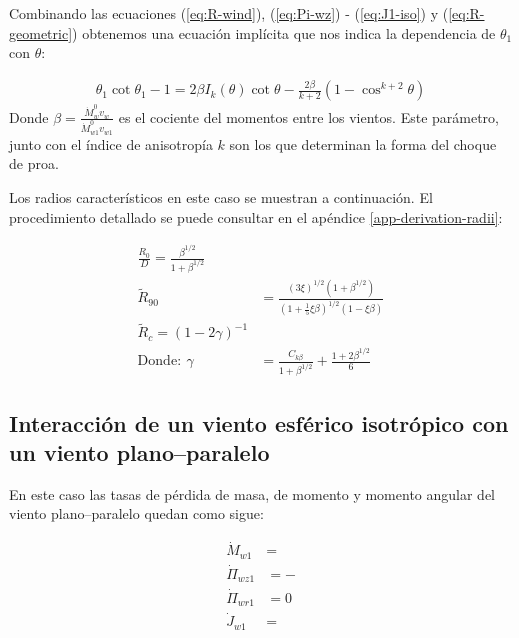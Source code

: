 Combinando las ecuaciones (\ref{eq:R-wind}), (\ref{eq:Pi-wz}) - (\ref{eq:J1-iso}) y (\ref{eq:R-geometric}) obtenemos una ecuación
implícita que nos indica la dependencia de $\theta_1$ con $\theta$:

\begin{align}
  \theta_1\cot\theta_1 -1 = 2\beta I_k(\theta)\cot\theta - \frac{2\beta}{k+2}\left(1 - \cos^{k+2}\theta\right) \label{eq:th1-th} 
\end{align}
Donde $\beta = \frac{\dot{M}^0_w v_w}{\dot{M}^0_{w1}v_{w1}}$ es el cociente del momentos entre los vientos. Este parámetro, junto con el
índice de anisotropía $k$ son los que determinan la forma del choque de proa. 

Los radios característicos en este caso se muestran a continuación. El procedimiento detallado se puede consultar en el apéndice
\ref{app-derivation-radii}:

\begin{align}
  \frac{R_0}{D} = \frac{\beta^{1/2}}{1+\beta^{1/2}} \\
    \tilde{R}_{90} &= \frac{\left(3\xi\right)^{1/2}\left(1+\beta^{1/2}\right)}
                     {\left(1+\frac{1}{5}\xi\beta\right)^{1/2}\left(1-\xi\beta\right)} \\
  \tilde{R}_c = \left(1 - 2\gamma\right)^{-1} \\
  \mathrm{Donde:~} \gamma &= \frac{C_{k\beta}}{1+\beta^{1/2}} + \frac{1 + 2\beta^{1/2}}{6} 

\end{align}


\subsection{Interacción de un viento esférico isotrópico con un viento plano--paralelo}

En este caso las tasas de pérdida de masa, de momento y momento angular del viento plano--paralelo quedan como sigue:

\begin{align}
  \dot{M}_{w1} &= \\
  \dot{\Pi}_{wz1} &= - \\
  \dot{\Pi}_{wr1} &= 0 \\
  \dot{J}_{w1} &= 
\end{align}


\begin{align}
\end{align}
